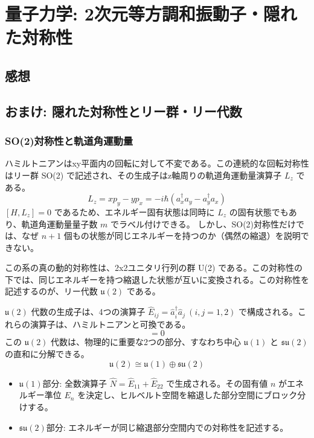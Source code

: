 \documentclass[../../sp_2022.tex]{subfiles}
\begin{document}
\setcounter{section}{0}
\section{量子力学: 2次元等方調和振動子・隠れた対称性}
\subsection{}


\subsection*{感想}

\subsection*{おまけ: 隠れた対称性とリー群・リー代数}

\subsubsection*{SO(2)対称性と軌道角運動量}
ハミルトニアンはxy平面内の回転に対して不変である。この連続的な回転対称性はリー群 SO(2) で記述され、その生成子はz軸周りの軌道角運動量演算子 $L_z$ である。
\begin{equation}
    L_z = xp_y - yp_x = -i\hbar(a_x^\dagger a_y - a_y^\dagger a_x)
\end{equation}
$[H, L_z] = 0$ であるため、エネルギー固有状態は同時に $L_z$ の固有状態でもあり、軌道角運動量量子数 $m$ でラベル付けできる。
しかし、SO(2)対称性だけでは、なぜ $n+1$ 個もの状態が同じエネルギーを持つのか（偶然の縮退）を説明できない。

この系の真の動的対称性は、2x2ユニタリ行列の群 {U(2)} である。この対称性の下では、同じエネルギーを持つ縮退した状態が互いに変換される。この対称性を記述するのが、リー代数 \(\mathfrak{u}(2)\) である。

\(\mathfrak{u}(2)\) 代数の生成子は、4つの演算子 $\hat{E}_{ij} = \hat{a}_i^\dagger \hat{a}_j \ (i,j=1,2)$ で構成される。これらの演算子は、ハミルトニアンと可換である。
\begin{equation}
    [\hat{H}, \hat{E}_{ij}] = 0
\end{equation}
この \(\mathfrak{u}(2)\) 代数は、物理的に重要な2つの部分、すなわち中心 \(\mathfrak{u}(1)\) と \(\mathfrak{su}(2)\) の直和に分解できる。
\begin{equation}
    \mathfrak{u}(2) \cong \mathfrak{u}(1) \oplus \mathfrak{su}(2)
\end{equation}
\begin{itemize}
    \item {\(\mathfrak{u}(1)\)部分}: 全数演算子 $\hat{N} = \hat{E}_{11} + \hat{E}_{22}$ で生成される。その固有値 $n$ がエネルギー準位 $E_n$ を決定し、ヒルベルト空間を縮退した部分空間にブロック分けする。
    \item {\(\mathfrak{su}(2)\)部分}: エネルギーが同じ縮退部分空間内での対称性を記述する。
\end{itemize}
\end{document}
